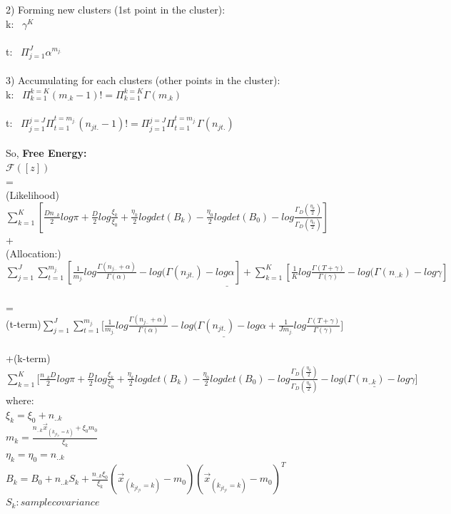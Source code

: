 \documentclass{article}
\begin{document}
\begin{spacing}{1.1}
2) Forming new clusters (1st point in the cluster): \\
k: \ $\gamma^{K}$\\ \\
t: \ $\Pi_{j=1}^{J}\alpha^{m_{j.}}$\\ \\

3) Accumulating for each clusters (other points in the cluster): \\

k: \ $\Pi_{k=1}^{k=K}(m_{.k}-1)!=\Pi_{k=1}^{k=K}\Gamma(m_{.k})$\\ \\
t: \ $\Pi_{j=1}^{j=J}\Pi_{t=1}^{t=m_{j.}}(n_{jt.}-1)!=\Pi_{j=1}^{j=J}\Pi_{t=1}^{t=m_{j.}}\Gamma(n_{jt.})$\\ \\

So,
\large {\bf  Free Energy:} \\
$\mathcal{F}([z])$\\ =\\
(Likelihood)$ \sum_{k=1}^{K} [\frac{D n_{..k}}{2}log\pi+\frac{D}{2}log\frac{\xi_{k}}{\xi_{0}}+\frac{\eta_{k}}{2}log det(B_{k})-\frac{\eta_{0}}{2}log det(B_{0})
-log \frac{\Gamma_{D}(\frac{\eta_{k}}{2})}{\Gamma_{D}(\frac{\eta_{0}}{2})}]$
\\
+
\\
(Allocation:)$\underline{\sum_{j=1}^{J}\sum_{t=1}^{m_{j.}}[\frac{1}{m_{j.}}log \frac{\Gamma(n_{j..}+\alpha)}{\Gamma(\alpha)} -log(\Gamma(n_{jt.})-log \alpha]+
 \sum_{k=1}^{K} [\frac{1}{K}log \frac{\Gamma(T+\gamma)}{\Gamma(\gamma)} -log(\Gamma(n_{..k})-log \gamma]}$
\\ \\
=\\
(t-term)$ \sum_{j=1}^{J}\sum_{t=1}^{m_{j.}}[\underline{\frac{1}{m_{j.}}log \frac{\Gamma(n_{j..}+\alpha)}{\Gamma(\alpha)} -log(\Gamma(n_{jt.})-log \alpha
+\frac{1}{J m_{j.}}log \frac{\Gamma(T+\gamma)}{\Gamma(\gamma)}]}$\\ \\
+(k-term)$\sum_{k=1}^{K} [\frac{n_{..k}D}{2}log\pi+\frac{D}{2}log\frac{\xi_{k}}{\xi_{0}}+\frac{\eta_{k}}{2}log det(B_{k})-\frac{\eta_{0}}{2}log det(B_{0})
-log \frac{\Gamma_{D}(\frac{\eta_{k}}{2})}{\Gamma_{D}(\frac{\eta_{0}}{2})}
-\underline{log(\Gamma(n_{..k})-log \gamma]}$\\
where:\\
$\xi_{k}=\xi_{0}+n_{..k}$\\
$m_{k}=\frac{n_{..k} \vec x_{(k_{jt_{ji}}=k)}+\xi_{0}m_{0}}{\xi_{k}}$\\
$\eta_{k}=\eta_{0}=n_{..k}$\\
$B_{k}=B_{0}+n_{..k}S_{k}+\frac{n_{..k}\xi_{0}}{\xi_{k}}(\vec x_{(k_{jt_{ji}}=k)}-m_{0})(\vec x_{(k_{jt_{ji}}=k)}-m_{0})^{T}$\\
$S_{k}: sample covariance$\\



\end{spacing}
\end{document}
